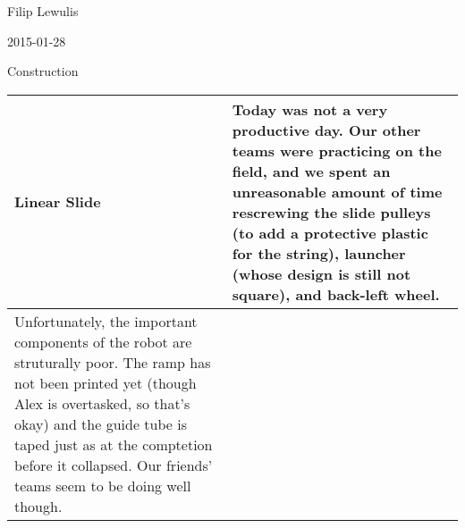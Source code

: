 Filip Lewulis

2015-01-28

Construction

\begin{tabular}{|p{5cm}|p{5cm}|}
\hline Linear Slide &
Today was not a very productive day. Our other teams were practicing on the field, and we spent an unreasonable amount of time rescrewing the slide pulleys (to add a protective plastic for the string), launcher (whose design is still not square), and back-left wheel.\\
\hline
Unfortunately, the important components of the robot are struturally poor. The ramp has not been printed yet (though Alex is overtasked, so that's okay) and the guide tube is taped just as at the comptetion before it collapsed. Our friends' teams seem to be doing well though.
\end{tabular}

